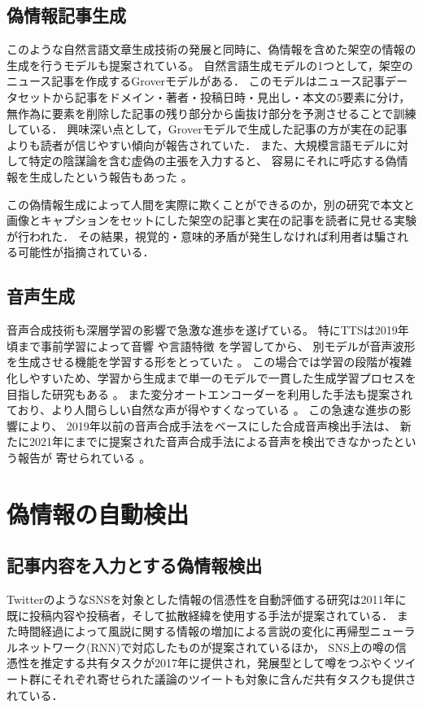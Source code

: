 \subsection{偽情報記事生成}
\label{sec:generate}
このような自然言語文章生成技術の発展と同時に、偽情報を含めた架空の情報の生成を行うモデルも提案されている。
自然言語生成モデルの1つとして，架空のニュース記事を作成するGroverモデルがある\cite{DBLP:journals/corr/abs-1905-12616}．
このモデルはニュース記事データセットから記事をドメイン・著者・投稿日時・見出し・本文の5要素に分け，無作為に要素を削除した記事の残り部分から歯抜け部分を予測させることで訓練している．
興味深い点として，Groverモデルで生成した記事の方が実在の記事よりも読者が信じやすい傾向が報告されていた．
また、大規模言語モデルに対して特定の陰謀論を含む虚偽の主張を入力すると、
容易にそれに呼応する偽情報を生成したという報告もあった \cite{vykopal-etal-2024-disinformation}。 

この偽情報生成によって人間を実際に欺くことができるのか，別の研究で本文と画像とキャプションをセットにした架空の記事と実在の記事を読者に見せる実験が行われた．
その結果，視覚的・意味的矛盾が発生しなければ利用者は騙される可能性が指摘されている\cite{tan-etal-2020-detecting}．

\subsection{音声生成}
音声合成技術も深層学習の影響で急激な進歩を遂げている。
特にTTSは2019年頃まで事前学習によって音響 \cite{6639215,8461368}や言語特徴 \cite{vandenoord16_ssw}を学習してから、
別モデルが音声波形を生成させる機能を学習する形をとっていた \cite{vandenoord16_ssw,pmlr-v80-kalchbrenner18a}。
この場合では学習の段階が複雑化しやすいため、学習から生成まで単一のモデルで一貫した生成学習プロセスを目指した研究もある \cite{wang17n_interspeech,ren2021fastspeech,donahue2021endtoend}。
また変分オートエンコーダーを利用した手法も提案されており、より人間らしい自然な声が得やすくなっている \cite{pmlr-v139-kim21f,https://doi.org/10.48550/arxiv.2205.04421}。
この急速な進歩の影響により、
2019年以前の音声合成手法をベースにした合成音声検出手法は、
新たに2021年にまでに提案された音声合成手法による音声を検出できなかったという報告が
寄せられている \cite{yamagishi21_asvspoof,yu_icmece}。

\section{偽情報の自動検出}
\subsection{記事内容を入力とする偽情報検出}
TwitterのようなSNSを対象とした情報の信憑性を自動評価する研究は2011年に既に投稿内容や投稿者，そして拡散経緯を使用する手法が提案されている\cite{10.1145/1963405.1963500}．
また時間経過によって風説に関する情報の増加による言説の変化に再帰型ニューラルネットワーク(RNN)で対応したものが提案されている\cite{10.5555/3061053.3061153}ほか，
SNS上の噂の信憑性を推定する共有タスクが2017年に提供され\cite{derczynski-etal-2017-semeval}，発展型として噂をつぶやくツイート群にそれぞれ寄せられた議論のツイートも対象に含んだ共有タスクも提供されている\cite{gorrell-etal-2019-semeval}．

